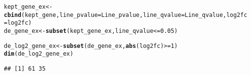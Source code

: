 \documentclass{article}\usepackage[]{graphicx}\usepackage[]{color}
\makeatletter
\newcommand{\hlnum}[1]{\textcolor[rgb]{0.686,0.059,0.569}{#1}}%
\newcommand{\hlopt}[1]{\textcolor[rgb]{0,0,0}{#1}}%
\newcommand{\hlstd}[1]{\textcolor[rgb]{0.345,0.345,0.345}{#1}}%
\newcommand{\hlkwb}[1]{\textcolor[rgb]{0.69,0.353,0.396}{#1}}%
\newcommand{\hlkwc}[1]{\textcolor[rgb]{0.333,0.667,0.333}{#1}}%
\newcommand{\hlkwd}[1]{\textcolor[rgb]{0.737,0.353,0.396}{\textbf{#1}}}%
\newenvironment{kframe}{%
 \def\at@end@of@kframe{}%
 \ifinner\ifhmode%
  \def\at@end@of@kframe{\end{minipage}}%
  \begin{minipage}{\columnwidth}%
 \fi\fi%
 \def\FrameCommand##1{\hskip\@totalleftmargin \hskip-\fboxsep
 \colorbox{shadecolor}{##1}\hskip-\fboxsep
     \hskip-\linewidth \hskip-\@totalleftmargin \hskip\columnwidth}%
 \MakeFramed {\advance\hsize-\width
   \@totalleftmargin\z@ \linewidth\hsize
   \@setminipage}}%
 {\par\unskip\endMakeFramed%
 \at@end@of@kframe}
\newenvironment{knitrout}{}{} %
\makeatother
\begin{document}
\begin{knitrout}
\begin{kframe}
\begin{alltt}
\hlstd{kept_gene_ex} \hlkwb{<-} \hlkwd{cbind}\hlstd{(kept_gene,} \hlkwc{line_pvalue} \hlstd{= Line_pvalue,} \hlkwc{line_qvalue} \hlstd{= Line_qvalue,} \hlkwc{log2fc} \hlstd{= log2fc)}
\hlstd{de_gene_ex} \hlkwb{<-} \hlkwd{subset}\hlstd{(kept_gene_ex, line_qvalue} \hlopt{<=} \hlnum{0.05}\hlstd{)}

\hlstd{de_log2_gene_ex} \hlkwb{<-} \hlkwd{subset}\hlstd{(de_gene_ex,} \hlkwd{abs}\hlstd{(log2fc)} \hlopt{>=} \hlnum{1}\hlstd{)}
\hlkwd{dim}\hlstd{(de_log2_gene_ex)}
\end{alltt}
\begin{verbatim}
## [1] 61 35
\end{verbatim}
\end{kframe}
\end{knitrout}
\end{document}
